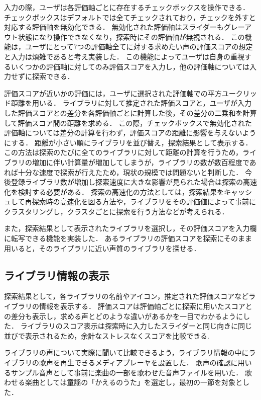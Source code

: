 入力の際，ユーザは各評価軸ごとに存在するチェックボックスを操作できる．
チェックボックスはデフォルトでは全てチェックされており，チェックを外すと対応する評価軸を無効化できる．
無効化された評価軸はスライダーもグレーアウト状態になり操作できなくなり，探索時にその評価軸が無視される．
この機能は，ユーザにとって7つの評価軸全てに対する求めたい声の評価スコアの想定と入力は煩雑であると考え実装した．
この機能によってユーザは自身の重視するいくつかの評価軸に対してのみ評価スコアを入力し，他の評価軸については入力せずに探索できる．

評価スコアが近いかの評価には，ユーザに選択された評価軸での平方ユークリッド距離を用いる．
ライブラリに対して推定された評価スコアと，ユーザが入力した評価スコアとの差分を各評価軸ごとに計算した後，その差分の二乗和を計算して評価スコア間の距離を求める．
この際，チェックボックスで無効化された評価軸については差分の計算を行わず，評価スコアの距離に影響を与えないようにする．
距離が小さい順にライブラリを並び替え，探索結果として表示する．
この方法は探索のたびに全てのライブラリに対して距離の計算を行うため，ライブラリの増加に伴い計算量が増加してしまうが，ライブラリの数が数百程度であれば十分な速度で探索が行えたため，現状の規模では問題ないと判断した．
今後登録ライブラリ数が増加し探索速度に大きな影響が見られた場合は探索の高速化を検討する必要がある．
探索の高速化の方法としては，探索結果をキャッシュして再探索時の高速化を図る方法や，ライブラリをその評価値によって事前にクラスタリングし，クラスタごとに探索を行う方法などが考えられる．

また，探索結果として表示されたライブラリを選択し，その評価スコアを入力欄に転写できる機能を実装した．
あるライブラリの評価スコアを探索にそのまま用いると，そのライブラリに近い声質のライブラリを探せる．

\subsection{ライブラリ情報の表示}

探索結果として，各ライブラリの名前やアイコン，推定された評価スコアなどライブラリの情報を表示する．
評価スコアは評価軸ごとに探索に用いたスコアとの差分も表示し，求める声とどのような違いがあるかを一目でわかるようにした．
ライブラリのスコア表示は探索時に入力したスライダーと同じ向きに同じ並びで表示されるため，余計なストレスなくスコアを比較できる.

ライブラリの声について実際に聞いて比較できるよう，ライブラリ情報の中にライブラリの歌声を再生できるメディアプレーヤを設置した．
歌声の確認に用いるサンプル音声として事前に楽曲の一部を歌わせた音声ファイルを用いた．
歌わせる楽曲としては童謡の「かえるのうた」を選定し，最初の一節を対象とした．

